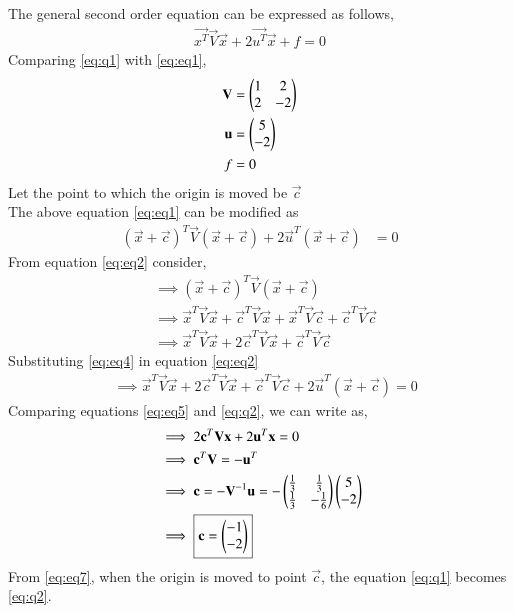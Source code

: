 \documentclass[journal,12pt,twocolumn]{IEEEtran}
\begin{document}
The general second order equation can be expressed as follows,
\begin{align}
\vec{x^T}\vec{V}\vec{x}+2\vec{u^T}\vec{x}+f=0\label{eq1}
\end{align}
Comparing \eqref{eq:q1} with \eqref{eq:eq1},
\begin{align}
\mathbf{V} &= \begin{pmatrix}1 & 2\\2 & -2\end{pmatrix}\\
\mathbf{u} &= \begin{pmatrix}5\\ -2\end{pmatrix}\\
f &= 0
\end{align}
Let the point to which the origin is moved be $\vec{c}$\\
The above equation \eqref{eq:eq1} can be modified as
\begin{align}
(\vec{x}+\vec{c})^T\vec{V}(\vec{x}+\vec{c})+2\vec{u}^T(\vec{x}+\vec{c})&=0\label{eq:eq2}
\end{align}
From equation \eqref{eq:eq2} consider,
\begin{align}
    &\implies(\vec{x}+\vec{c})^T\vec{V}(\vec{x}+\vec{c})\\
    &\implies\vec{x}^T\vec{V}\vec{x}+\vec{c}^T\vec{V}\vec{x}+\vec{x}^T\vec{V}\vec{c}+\vec{c}^T\vec{V}\vec{c}\label{eq:eq3}\\
    &\implies\vec{x}^T\vec{V}\vec{x}+2\vec{c}^T\vec{V}\vec{x}+\vec{c}^T\vec{V}\vec{c}\label{eq:eq4}
\end{align}
Substituting \eqref{eq:eq4} in equation \eqref{eq:eq2}
\begin{align}
    &\implies\vec{x}^T\vec{V}\vec{x}+2\vec{c}^T\vec{V}\vec{x}+\vec{c}^T\vec{V}\vec{c}+2\vec{u}^T(\vec{x}+\vec{c})=0 \label{eq:eq5}
\end{align}
Comparing equations \eqref{eq:eq5} and \eqref{eq:q2}, we can write as,
\begin{align}
    &\implies 2\mathbf{c}^T\mathbf{V}\mathbf{x}+2\mathbf{u}^T\mathbf{x}=0\\
    &\implies \mathbf{c}^T\mathbf{V}= -\mathbf{u}^T\\
    &\implies \mathbf{c}= -\mathbf{V}^{-1}\mathbf{u}= -\begin{pmatrix}\frac{1}{3}&\frac{1}{3}\\ \frac{1}{3}&-\frac{1}{6}\end{pmatrix}\begin{pmatrix}5\\-2\end{pmatrix} \label{eq:eq6}\\
    &\implies \boxed{\mathbf{c}= \begin{pmatrix}-1\\-2\end{pmatrix}} \label{eq:eq7}
\end{align}
From \eqref{eq:eq7}, when the origin is moved to point $\vec{c}$, the equation \eqref{eq:q1} becomes \eqref{eq:q2}.\\
\end{document}
